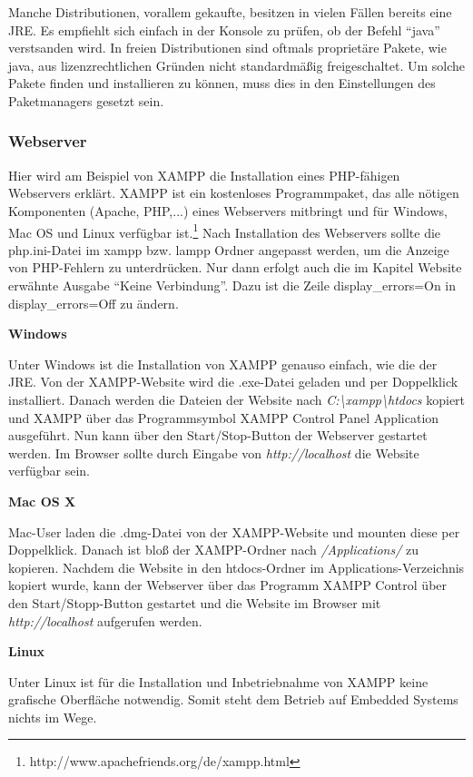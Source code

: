 \documentclass[a4paper,14pt,headsepline]{scrartcl}
\begin{document}
Manche Distributionen, vorallem gekaufte, besitzen in vielen Fällen bereits eine JRE. Es empfiehlt sich einfach in der Konsole zu prüfen, ob der Befehl ``java'' verstsanden wird. In freien Distributionen sind oftmals proprietäre Pakete, wie java, aus lizenzrechtlichen Gründen nicht standardmäßig freigeschaltet. Um solche Pakete finden und installieren zu können, muss dies in den Einstellungen des Paketmanagers gesetzt sein.  

\newpage

\subsubsection{Webserver}
Hier wird am Beispiel von XAMPP die Installation eines PHP-fähigen Webservers erklärt. XAMPP ist ein kostenloses Programmpaket, das alle nötigen Komponenten (Apache, PHP,...) eines Webservers mitbringt und für Windows, Mac OS und Linux verfügbar ist.\footnote{http://www.apachefriends.org/de/xampp.html} Nach Installation des Webservers sollte die php.ini-Datei im xampp bzw. lampp Ordner angepasst werden, um die Anzeige von PHP-Fehlern zu unterdrücken. Nur dann erfolgt auch die im Kapitel Website erwähnte Ausgabe ``Keine Verbindung''. Dazu ist die Zeile display\_errors=On in display\_errors=Off zu ändern. 

\textbf{Windows}

Unter Windows ist die Installation von XAMPP genauso einfach, wie die der JRE. Von der XAMPP-Website wird die .exe-Datei geladen und per Doppelklick installiert. Danach werden die Dateien der Website nach \textit{C:\textbackslash xampp\textbackslash htdocs} kopiert und XAMPP über das Programmsymbol XAMPP Control Panel Application ausgeführt. Nun kann über den Start/Stop-Button der Webserver gestartet werden. Im Browser sollte durch Eingabe von \textit{http://localhost} die Website verfügbar sein. 

\textbf{Mac OS X}

Mac-User laden die .dmg-Datei von der XAMPP-Website und mounten diese per Doppelklick. Danach ist bloß der XAMPP-Ordner nach \textit{/Applications/} zu kopieren. Nachdem die Website in den htdocs-Ordner im Applications-Verzeichnis kopiert wurde, kann der Webserver über das Programm XAMPP Control über den Start/Stopp-Button gestartet und die Website im Browser mit \textit{http://localhost} aufgerufen werden. 

\newpage

\textbf{Linux}

Unter Linux ist für die Installation und Inbetriebnahme von XAMPP keine grafische Oberfläche notwendig. Somit steht dem Betrieb auf Embedded Systems nichts im Wege. 
\end{document}
